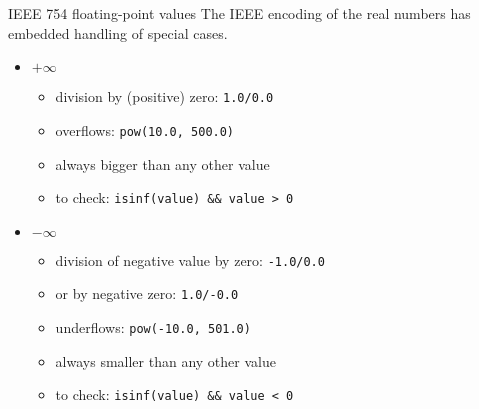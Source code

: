\documentclass[aspectratio=169,14pt]{beamer}
\begin{document}
\begin{frame}{IEEE 754 floating-point values}
The IEEE encoding of the real numbers has embedded handling of special cases.

\begin{itemize}
    \item \( + \infty \)\\
    \begin{itemize}
        \item division by (positive) zero: \texttt{1.0/0.0}
        \item overflows: \texttt{pow(10.0, 500.0)}
        \item always bigger than any other value
        \item to check: \texttt{isinf(value) \&\& value > 0}
    \end{itemize}

    \item \( - \infty \)\\
    \begin{itemize}
        \item division of negative value by zero: \texttt{-1.0/0.0}
        \item or by negative zero: \texttt{1.0/-0.0}
        \item underflows: \texttt{pow(-10.0, 501.0)}
        \item always smaller than any other value
        \item to check: \texttt{isinf(value) \&\& value < 0}
    \end{itemize}
\end{itemize}
\end{frame}
\end{document}
